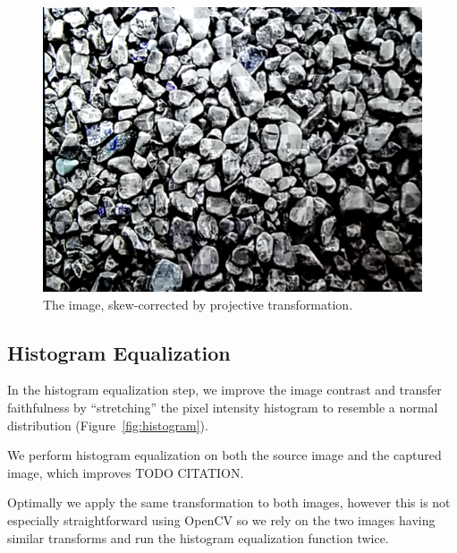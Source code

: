 \documentclass[11pt, letterpaper]{article}
\begin{document}
\begin{figure}[hbtp]
\centering
\includegraphics[scale=0.2]{img/skew2.png}
\caption{The image, skew-corrected by projective transformation.}
\label{fig:skew2}
\end{figure}

\subsection{Histogram Equalization}
In the histogram equalization step, we improve the image contrast and transfer faithfulness by ``stretching'' the pixel intensity histogram to resemble a normal distribution (Figure~\ref{fig:histogram}).

We perform histogram equalization on both the source image and the captured image, which improves TODO CITATION.

Optimally we apply the same transformation to both images, however this is not especially straightforward using OpenCV so we rely on the two images having similar transforms and run the histogram equalization function twice.
\end{document}
